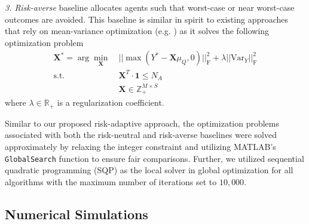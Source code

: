 \documentclass[letterpaper, 10 pt, conference]{ieeeconf}  %
\begin{document}
\vspace{3pt}
\noindent \textit{3. Risk-averse} baseline allocates agents such that worst-case or near worst-case outcomes are avoided. This baseline is similar in spirit to existing approaches that rely on mean-variance optimization (e.g. \cite{ravichandar2020,yang_algorithm_2018}) as it solves the following optimization problem
\begin{align}
    \bm{X}^* = \arg \min_{\bm{X}} &\ ||\max (Y^* - \bm{X}\mu_Q , 0)||^2_\text{F} + \lambda ||\mathrm{Var}_{Y} ||^2_\text{F} \nonumber \\
    \mathrm{s.t.} &\ \bm{X}^T \cdot \bm{1} \leq N_A \nonumber \\
    &\ \bm{X} \in \mathbb{Z}_+^{M \times S}
    \nonumber
\end{align}
where $\lambda \in \mathbb{R}_+$ is a regularization coefficient.

Similar to our proposed risk-adaptive approach, the optimization problems associated with both the risk-neutral and risk-averse baselines were solved approximately by relaxing the integer constraint and utilizing MATLAB's \verb|GlobalSearch| function to ensure fair comparisons. Further, we utilized sequential quadratic programming (SQP) as the local solver in global optimization for all algorithms with the maximum number of iterations set to $10,000$.

\subsection{Numerical Simulations}
\end{document}
